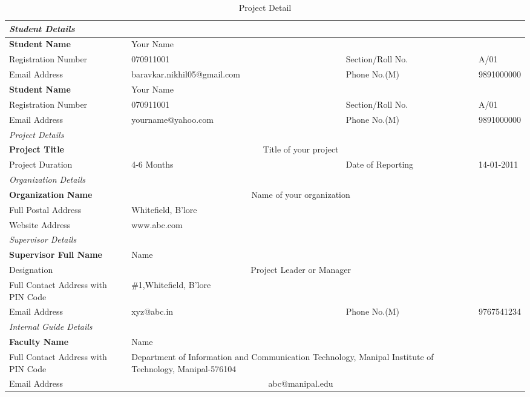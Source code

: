 
\begin{table}
\begin{scriptsize}
\caption{Project Detail}
\begin{tabularx}{\textwidth}{|X|X|X|X|}
\multicolumn{4}{l}{\textit{Student Details}}\\ 
\hline
\textbf{Student Name}&\multicolumn{2}{X}{Your Name}&\\ \hline
Registration Number&070911001&Section/Roll No.& A/01\\ \hline
Email Address&\tiny{baravkar.nikhil05@gmail.com}&Phone No.(M)&9891000000 \\  \hline
\textbf{Student Name}&\multicolumn{2}{X}{Your Name}&\\ \hline
Registration Number&070911001&Section/Roll No.& A/01\\ \hline
Email Address&\tiny{yourname@yahoo.com}&Phone No.(M)&9891000000 \\  \hline
\multicolumn{4}{l}{\textit{Project Details}}\\ \hline
\textbf{Project Title}&\multicolumn{2}{c}{Title of your project}& \\ \hline
Project Duration& 4-6 Months&Date of Reporting& 14-01-2011 \\ \hline
\multicolumn{4}{l}{\textit{Organization Details}}\\ \hline
\textbf{Organization Name}&\multicolumn{2}{c}{Name of your organization}& \\ \hline
Full Postal Address&\multicolumn{2}{X}{Whitefield, B'lore} &\\ \hline
Website Address&\multicolumn{2}{X}{www.abc.com} &\\ \hline
\multicolumn{4}{l}{\textit{Supervisor Details}}\\ \hline
\textbf{Supervisor Full Name}&\multicolumn{2}{X}{Name}& \\ \hline
Designation&\multicolumn{2}{c}{Project Leader or Manager} &\\ \hline
Full Contact Address with PIN Code&\multicolumn{2}{X}{\#1,Whitefield, B'lore}& \\ \hline
Email Address&xyz@abc.in&Phone No.(M)&9767541234\\ \hline
\multicolumn{4}{l}{\textit{Internal Guide Details}}\\ \hline
\textbf{Faculty Name}&\multicolumn{2}{X}{Name} &\\ \hline
Full Contact Address with PIN Code&\multicolumn{2}{p{6cm}}{Department of Information and Communication Technology,  Manipal Institute of Technology, Manipal-576104}& \\ \hline
Email Address&\multicolumn{2}{c}{abc@manipal.edu}&\\  \hline
\end{tabularx}
\end{scriptsize}
\end{table}
